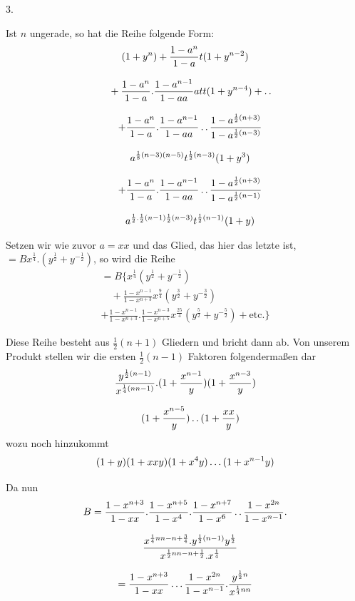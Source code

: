 \par\medskip{}\centerline{3.}\nobreak\smallskip
Ist $n$ ungerade, so hat die Reihe folgende Form:
\[
\begin{gathered}
(1+y^n)+\frac{1-a^n}{1-a}t(1+y^{n-2})
\\[8pt]\quad{}+\frac{1-a^n}{1-a}.\frac{1-a^{n-1}}{1-aa}att(1+y^{n-4})+\mathinner{.\,.}\\[8pt]
\quad+\frac{1-a^n}{1-a}.\frac{1-a^{n-1}}{1-aa}\mathinner{.\,.}\frac{1-a^{\frac12(n+3)}}{1-a^{\frac12(n-3)}}\\[8pt]\quad{}a^{\frac18(n-3)(n-5)}t^{\frac12(n-3)}(1+y^3)\\[8pt]
\quad+\frac{1-a^n}{1-a}.\frac{1-a^{n-1}}{1-aa}\mathinner{.\,.}\frac{1-a^{\frac12(n+3)}}{1-a^{\frac12(n-1)}}\\[8pt]\quad{}a^{\frac12.\frac12(n-1)\frac12(n-3)}t^{\frac12(n-1)}(1+y)
\end{gathered}
\]

Setzen wir wie zuvor $a=xx$ und das Glied, das hier das letzte ist, $=Bx^{\frac14}.(y^{\frac12}+y^{-\frac12})$, so wird die Reihe
\[
\begin{gathered}
=B\{x^{\frac14}(y^{\frac12}+y^{-\frac12})
\\[8pt]\quad{}+\frac{1-x^{n-1}}{1-x^{n+3}}x^{\frac94}(y^{\frac32}+y^{-\frac32})\\[8pt]
+\frac{1-x^{n-1}}{1-x^{n+3}}.\frac{1-x^{n-3}}{1-x^{n+5}}x^{\frac{25}4}(y^{\frac52}+y^{-\frac52})+\text{etc.}\}
\end{gathered}
\]




Diese Reihe besteht aus $\frac12(n+1)$ Gliedern und bricht dann ab. Von unserem Produkt stellen wir die ersten $\frac12(n-1)$ Faktoren folgendermaßen dar
\[
\begin{gathered}\frac{y^{\frac12(n-1)}}{x^{\frac14(nn-1)}}.(1+\frac{x^{n-1}}y)(1+\frac{x^{n-3}}y)\\[8pt]\quad{}(1+\frac{x^{n-5}}y)\mathinner{.\,.}(1+\frac{xx}y)\end{gathered}
\]
wozu noch hinzukommt
\[
(1+y)(1+xxy)(1+x^4y)\mathinner{.\,.\,.}(1+x^{n-1}y)
\]

Da nun
\[
\begin{gathered}
B=\frac{1-x^{n+3}}{1-xx}.\frac{1-x^{n+5}}{1-x^4}.\frac{1-x^{n+7}}{1-x^6}\mathinner{.\,.}\frac{1-x^{2n}}{1-x^{n-1}}.
\\[8pt]\quad{}\frac{x^{\frac14nn-n+\frac34}.y^{\frac12(n-1)}y^{\frac12}}{x^{\frac12nn-n+\frac12}.x^{\frac14}}\\[8pt]
=\frac{1-x^{n+3}}{1-xx}\mathinner{.\,.\,.}\frac{1-x^{2n}}{1-x^{n-1}}.\frac{y^{\frac12n}}{x^{\frac14nn}}
\end{gathered}
\]

